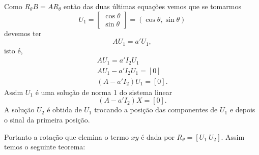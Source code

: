 Como $R_\theta B = AR_\theta$ então das duas últimas equações vemos que se tomarmos
\[
    U_1 = \begin{bmatrix}
        \cos\theta \\
        \sin\theta
    \end{bmatrix} = (\cos\theta, \sin\theta)
\]
devemos ter
\[
    AU_1 = a'U_1,
\]
isto é,
\begin{align*}
    AU_1 = a'I_2 U_1       \\
    AU_1 - a'I_2 U_1 = [0] \\
    (A - a'I_2)U_1 = [0].
\end{align*}
Assim $U_1$ é uma solução de norma 1 do sistema linear
\[
    (A - a'I_2)X = [0].
\]
A solução $U_2$ é obtida de $U_1$ trocando a posição das componentes de $U_1$ e depois o sinal da primeira posição.

Portanto a rotação que elemina o termo $xy$ é dada por $R_\theta = [U_1\ U_2]$. Assim temos o seguinte teorema:


